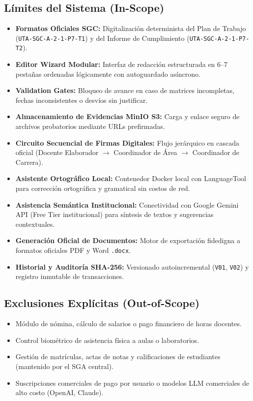 \documentclass[12pt,a4paper]{article}
\begin{document}
\subsection{Límites del Sistema (In-Scope)}
\begin{itemize}[leftmargin=1.5em, itemsep=2pt]
    \item \textbf{Formatos Oficiales SGC:} Digitalización determinista del Plan de Trabajo (\texttt{UTA-SGC-A-2-1-P7-T1}) y del Informe de Cumplimiento (\texttt{UTA-SGC-A-2-1-P7-T2}).
    \item \textbf{Editor Wizard Modular:} Interfaz de redacción estructurada en 6--7 pestañas ordenadas lógicamente con autoguardado asíncrono.
    \item \textbf{Validation Gates:} Bloqueo de avance en caso de matrices incompletas, fechas inconsistentes o desvíos sin justificar.
    \item \textbf{Almacenamiento de Evidencias MinIO S3:} Carga y enlace seguro de archivos probatorios mediante URLs prefirmadas.
    \item \textbf{Circuito Secuencial de Firmas Digitales:} Flujo jerárquico en cascada oficial (Docente Elaborador $\rightarrow$ Coordinador de Área $\rightarrow$ Coordinador de Carrera).
    \item \textbf{Asistente Ortográfico Local:} Contenedor Docker local con LanguageTool para corrección ortográfica y gramatical sin costos de red.
    \item \textbf{Asistencia Semántica Institucional:} Conectividad con Google Gemini API (Free Tier institucional) para síntesis de textos y sugerencias contextuales.
    \item \textbf{Generación Oficial de Documentos:} Motor de exportación fidedigna a formatos oficiales PDF y Word \texttt{.docx}.
    \item \textbf{Historial y Auditoría SHA-256:} Versionado autoincremental (\texttt{V01}, \texttt{V02}) y registro inmutable de transacciones.
\end{itemize}

\subsection{Exclusiones Explícitas (Out-of-Scope)}
\begin{itemize}[leftmargin=1.5em, itemsep=2pt]
    \item Módulo de nómina, cálculo de salarios o pago financiero de horas docentes.
    \item Control biométrico de asistencia física a aulas o laboratorios.
    \item Gestión de matrículas, actas de notas y calificaciones de estudiantes (mantenido por el SGA central).
    \item Suscripciones comerciales de pago por usuario o modelos LLM comerciales de alto costo (OpenAI, Claude).
\end{itemize}
\end{document}
